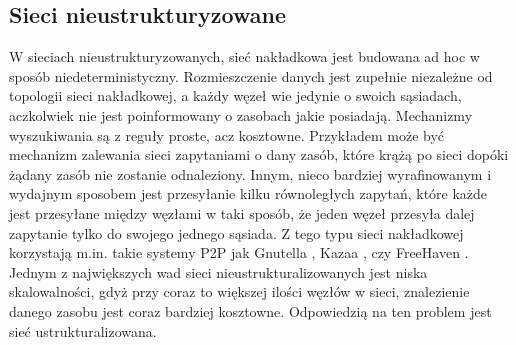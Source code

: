 \documentclass[12pt, twoside, openany]{report}
\begin{document}
\subsection{Sieci nieustrukturyzowane}
\label{paragraf_sieci_ustrukturyzowane}
W sieciach nieustrukturyzowanych, sieć nakładkowa jest budowana ad hoc w sposób niedeterministyczny. Rozmieszczenie danych jest zupełnie niezależne od topologii sieci nakładkowej, a każdy węzeł wie jedynie o swoich sąsiadach, aczkolwiek nie jest poinformowany o zasobach jakie posiadają. Mechanizmy wyszukiwania są z reguły proste, acz kosztowne. Przykładem może być mechanizm zalewania sieci zapytaniami o dany zasób, które krążą po sieci dopóki żądany zasób nie zostanie odnaleziony. Innym, nieco bardziej wyrafinowanym i wydajnym sposobem jest przesyłanie kilku równoległych zapytań, które każde jest przesyłane między węzłami w taki sposób, że jeden węzeł przesyła dalej zapytanie tylko do swojego jednego sąsiada. Z tego typu sieci nakładkowej korzystają m.in. takie systemy P2P jak Gnutella \cite{bib:gnutella}, Kazaa \cite{bib:kazaa}, czy FreeHaven \cite{bib:freehaven}. Jednym z największych wad sieci nieustrukturalizowanych jest niska skalowalności, gdyż przy coraz to większej ilości węzłów w sieci, znalezienie danego zasobu jest coraz bardziej kosztowne. Odpowiedzią na ten problem jest sieć ustrukturalizowana.
\end{document}
